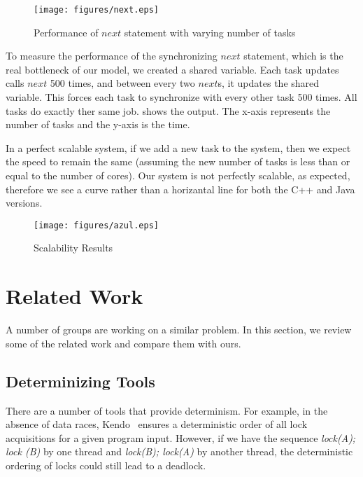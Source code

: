 \documentclass[10pt, conference, compsocconf]{IEEEtran}
\begin{document}
\begin{figure*}[htbp]
\texttt{[image: figures/next.eps]}
\caption{Performance of $next$ statement with varying number of tasks}
\label{fig:next}
\end{figure*}


To measure the performance of the synchronizing $next$ statement, which
is the real bottleneck of our model, we created a shared variable.
Each task updates calls $next$ 500 times, and between every two $next$s, it
updates the shared variable. This  forces
each task to synchronize with every other task 500 times.
All tasks do exactly ther same job.  shows the output.
The x-axis represents the number of tasks and the y-axis is the time.

In a perfect scalable system, if we add a new task to the system, then we 
expect the  speed to remain the same (assuming the new number of tasks is less 
than or equal to the number of cores). Our system is not perfectly scalable,
as expected, therefore we see a curve rather than a horizantal line for both
the C++ and Java versions.



\begin{figure*}[htbp]
\texttt{[image: figures/azul.eps]}
\caption{Scalability Results}
\label{fig:azul}
\end{figure*}



\section{Related Work}
\label{sec:related}

A number of groups are working on a similar problem.
In this section, we review some of the related work
and compare them with ours.
 
\subsection{Determinizing Tools} 
 
There are a number of tools that provide determinism. For example, 
in the absence of data races, Kendo~\cite{olszewski2009kendo} ensures 
a deterministic order of all lock acquisitions for a given program input. 
However, if we have the sequence \emph{lock(A); lock (B)} by one thread 
and \emph{lock(B); lock(A)} by another thread, the deterministic ordering 
of locks could still lead to a deadlock. 
 
\end{document}

